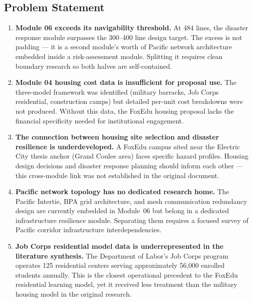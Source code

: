 \documentclass[11pt,letterpaper]{article}
\begin{document}
\subsection{Problem Statement}

\begin{enumerate}[leftmargin=1.5em]
  \item \textbf{Module 06 exceeds its navigability threshold.} At 484 lines, the disaster response module surpasses the 300--400 line design target. The excess is not padding --- it is a second module's worth of Pacific network architecture embedded inside a risk-assessment module. Splitting it requires clean boundary research so both halves are self-contained.

  \item \textbf{Module 04 housing cost data is insufficient for proposal use.} The three-model framework was identified (military barracks, Job Corps residential, construction camps) but detailed per-unit cost breakdowns were not produced. Without this data, the FoxEdu housing proposal lacks the financial specificity needed for institutional engagement.

  \item \textbf{The connection between housing site selection and disaster resilience is underdeveloped.} A FoxEdu campus sited near the Electric City thesis anchor (Grand Coulee area) faces specific hazard profiles. Housing design decisions and disaster response planning should inform each other --- this cross-module link was not established in the original document.

  \item \textbf{Pacific network topology has no dedicated research home.} The Pacific Intertie, BPA grid architecture, and mesh communication redundancy design are currently embedded in Module~06 but belong in a dedicated infrastructure resilience module. Separating them requires a focused survey of Pacific corridor infrastructure interdependencies.

  \item \textbf{Job Corps residential model data is underrepresented in the literature synthesis.} The Department of Labor's Job Corps program operates 125 residential centers serving approximately 56{,}000 enrolled students annually. This is the closest operational precedent to the FoxEdu residential learning model, yet it received less treatment than the military housing model in the original research.
\end{enumerate}
\end{document}
